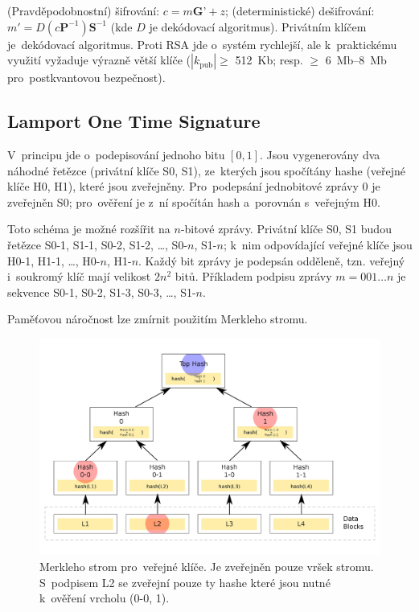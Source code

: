 (Pravděpodobnostní) šifrování: $c = m\textbf{G'} + z$; (deterministické) dešifrování: $m' = D(c\textbf{P}^{-1})\textbf{S}^{-1}$ (kde $D$ je dekódovací algoritmus).
Privátním klíčem je~dekódovací algoritmus.
Proti RSA jde o~systém rychlejší, ale k~praktickému využití vyžaduje výrazně větší klíče ($| k_\text{pub} | \geq$ 512~Kb; resp. $\geq$ 6~Mb--8~Mb pro~postkvantovou bezpečnost).


\subsection{Lamport One Time Signature}

V~principu jde o~podepisování jednoho bitu $[0,1]$.
Jsou vygenerovány dva náhodné řetězce (privátní klíče S0, S1), ze~kterých jsou spočítány hashe (veřejné klíče H0, H1), které jsou zveřejněny.
Pro~podepsání jednobitové zprávy $0$ je zveřejněn S0; pro~ověření je z~ní spočítán hash a~porovnán s~veřejným H0.

Toto schéma je možné rozšířit na $n$-bitové zprávy.
Privátní klíče S0, S1 budou řetězce S0-1, S1-1, S0-2, S1-2, \dots, S0-$n$, S1-$n$;
k~nim odpovídající veřejné klíče jsou H0-1, H1-1, \dots, H0-$n$, H1-$n$.
Každý bit zprávy je podepsán odděleně, tzn. veřejný i~soukromý klíč mají velikost $2n^2$ bitů.
Příkladem podpisu zprávy $m = 001\dots{}n$ je sekvence S0-1, S0-2, S1-3, S0-3, \dots, S1-$n$.

Paměťovou náročnost lze zmírnit použitím Merkleho stromu.

\begin{figure}[ht]
    \centering
    \includegraphics[width=\textwidth]{img/hash-merkle-tree}
    \caption[Merkleho strom pro~hashe]{Merkleho strom pro~veřejné klíče. Je zveřejněn pouze vršek stromu. S~podpisem L2 se zveřejní pouze ty hashe které jsou nutné k~ověření vrcholu (0-0, 1).}
\end{figure}

